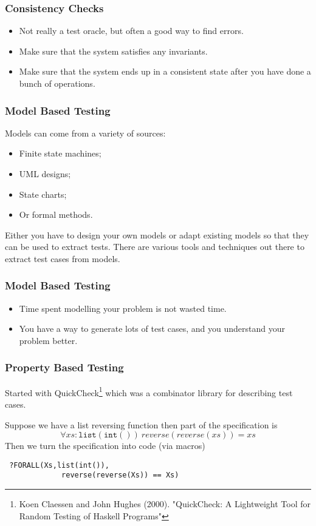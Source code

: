 \documentclass{beamer}
\begin{document}
\begin{frame}
  \frametitle{Consistency Checks}

  \begin{itemize}
  \item   Not really a test oracle, but often a good way to find errors.
  \item Make sure that the system satisfies any invariants.
  \item Make sure that the system ends up in a consistent state after you have
    done a bunch of operations.
  \end{itemize}
\end{frame}
\begin{frame}
  \frametitle{Model Based Testing}

  Models can come from a variety of sources:
  \begin{itemize}
  \item Finite state machines;
  \item UML designs;
  \item State charts;
  \item Or formal methods.
  \end{itemize}
  Either you have to design your own models or adapt existing models so that
  they can be used to extract tests. There are various tools and techniques
  out there to extract test cases from models.
  
\end{frame}
\begin{frame}
  \frametitle{Model Based Testing}
  \begin{itemize}
  \item Time spent modelling your problem is not wasted time.
  \item You have a way to generate lots of test cases, and you understand your
    problem better.
  \end{itemize}
\end{frame}
\begin{frame}[fragile]
  \frametitle{Property Based Testing}
Started with QuickCheck\footnote{Koen Claessen and John Hughes
  (2000). "QuickCheck: A Lightweight Tool for Random Testing of Haskell
  Programs"} which was a combinator library for describing test cases.


Suppose we have a list reversing function then part of the  specification is
\[
  \forall xs:\mathtt{list(int())\ } reverse(reverse(xs))=xs
\]
Then we turn the specification into code (via macros)
\begin{verbatim}
 ?FORALL(Xs,list(int()),
             reverse(reverse(Xs)) == Xs)
\end{verbatim}

\end{frame}
\end{document}
